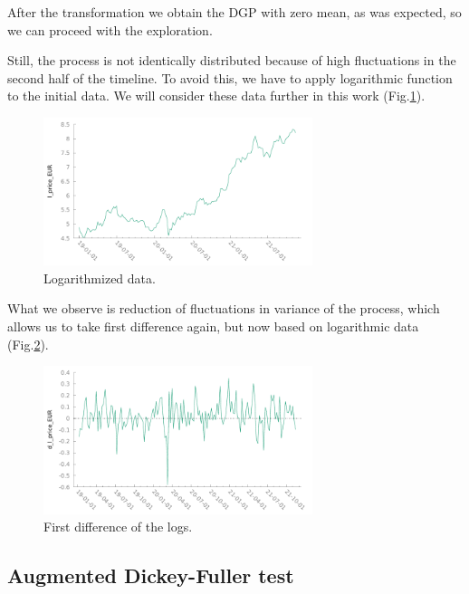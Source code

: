 \documentclass[14pt,a4paper]{extarticle}
\newcounter{e}
\numberwithin{equation}{section}
\numberwithin{figure}{section}
\begin{document}
After the transformation we obtain the DGP with zero mean, as was expected, so we can proceed with the exploration.

Still, the process is not identically distributed because of high fluctuations in the second half of the timeline. To avoid this, we have to apply logarithmic function to the initial data. We will consider these data further in this work (Fig.\ref{fig:log}).

\begin{figure}[h]
	\hspace{-1.5cm}
	\centering
	\includegraphics[width=0.7\textwidth]{resources/log.pdf}
	\caption{Logarithmized data.}
	\label{fig:log}
\end{figure}

What we observe is reduction of fluctuations in variance of the process, which allows us to take first difference again, but now based on logarithmic data (Fig.\ref{fig:log_difference}).

\begin{figure}[h]
	\hspace{-1.5cm}
	\centering
	\includegraphics[width=0.7\textwidth]{resources/log_difference.pdf}
	\caption{First difference of the logs.}
	\label{fig:log_difference}
\end{figure}

\newpage
\subsection{Augmented Dickey-Fuller test}
\end{document}
